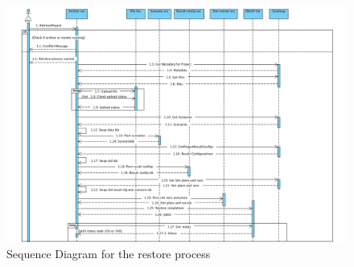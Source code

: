 \begin{figure}[H]
    \centering \includegraphics[scale=0.5, angle=90, origin=c]{grafiken/sequenceRestore.png}
    \caption{Sequence Diagram for the restore process}
    \label{fig:sequenceRestore}
\end{figure}

